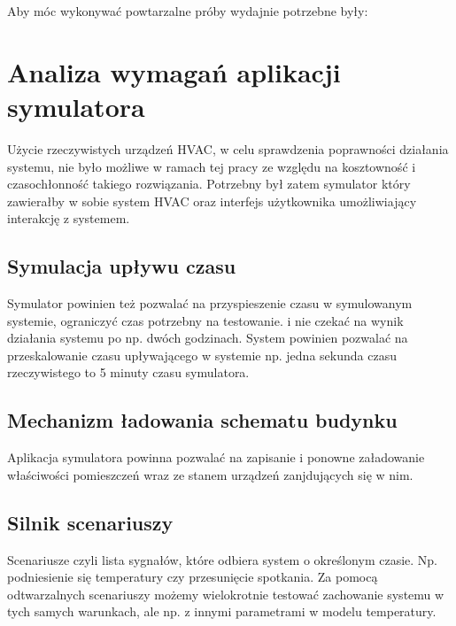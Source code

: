 Aby móc wykonywać powtarzalne próby wydajnie potrzebne były:

\section{Analiza wymagań aplikacji symulatora}
Użycie rzeczywistych urządzeń HVAC, w celu sprawdzenia poprawności działania systemu, nie było możliwe w ramach tej pracy ze względu na kosztowność i czasochłonność takiego rozwiązania. 
Potrzebny był zatem symulator który zawierałby w sobie system HVAC oraz interfejs użytkownika umożliwiający interakcję z systemem. 

\subsection*{Symulacja upływu czasu}
Symulator powinien też pozwalać na przyspieszenie czasu w symulowanym systemie, ograniczyć czas potrzebny na testowanie.
i nie czekać na wynik działania systemu po np. dwóch godzinach. System powinien pozwalać na przeskalowanie czasu upływającego w systemie np. jedna sekunda czasu rzeczywistego to 5 minuty czasu symulatora.

\subsection*{Mechanizm ładowania schematu budynku}
Aplikacja symulatora powinna pozwalać na zapisanie i ponowne załadowanie właściwości pomieszczeń wraz ze stanem urządzeń zanjdujących się w nim.

\subsection*{Silnik scenariuszy}
Scenariusze czyli lista sygnałów, które odbiera system o określonym czasie. Np. podniesienie się temperatury czy przesunięcie spotkania. Za pomocą odtwarzalnych scenariuszy możemy wielokrotnie testować zachowanie systemu w tych samych warunkach, ale np. z innymi parametrami w modelu temperatury.
